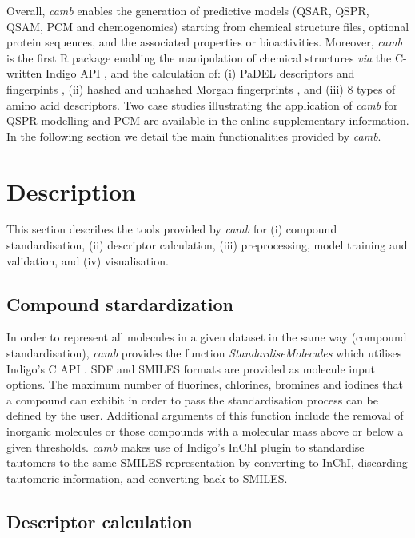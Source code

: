 \documentclass{bioinfo}
\begin{document}
Overall, {\it camb} enables the generation of predictive  models (QSAR, QSPR, QSAM, PCM and chemogenomics)
starting from chemical structure files, optional protein sequences, and the associated properties or bioactivities.
Moreover, {\it camb} is the first R package enabling the manipulation of chemical structures {\it via} the C-written Indigo API \citep{Indigo},
and the calculation of:
(i) PaDEL descriptors and fingerpints \citep{padel},
(ii) hashed and unhashed Morgan fingerprints \citep{extended_fp},
and (iii) 8 types of amino acid descriptors. 
Two case studies illustrating the application of {\it camb} for
QSPR modelling and PCM are available in the online supplementary information.
In the following section we detail the main functionalities provided by {\it camb}. 

\section{Description}
This section describes the tools provided by {\it camb} 
for (i) compound standardisation, (ii) descriptor calculation, 
(iii) preprocessing, model training and validation, and (iv) visualisation. %

\subsection{Compound stardardization}

In order to represent all molecules in a given dataset in the same 
way (compound standardisation),
{\it camb}  provides the function {\it StandardiseMolecules} which utilises Indigo's C API \citep{Indigo}.
SDF and SMILES formats are provided as molecule input options.
The maximum number of fluorines, chlorines, bromines and iodines
that a compound can exhibit in order to pass the standardisation process can be defined by the user.
Additional arguments of this function include the removal of inorganic molecules
or those compounds with a molecular mass above or below a given thresholds.
{\it camb} makes use of Indigo's InChI plugin to standardise tautomers to the same SMILES representation
by converting to InChI, discarding tautomeric information, and converting back to SMILES.

\subsection{Descriptor calculation} 
\end{document}
